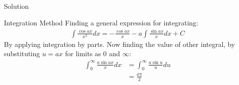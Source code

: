 \documentclass{beamer}
\begin{document}
\begin{frame}{Solution}
\begin{block}{Integration Method}
Finding a general expression for integrating:
\begin{align}
    \int \frac{\cos{ax}}{x^2}dx=-\frac{\cos{ax}}{x}-a\int\frac{\sin{ax}}{x}dx + C\label{gen1}
\end{align}
By applying integration by parts. Now finding the value of other integral, by substituting $u=ax$ for limits as $0$ and $\infty$:
\begin{align}
    \int_0^\infty\frac{a\sin{ax}}{x}dx &= \int_0^\infty\frac{a\sin{u}}{u}du\\
    &=\frac{a\pi}{2}\label{gen2}
\end{align}
\end{block}
\end{frame}
\end{document}
